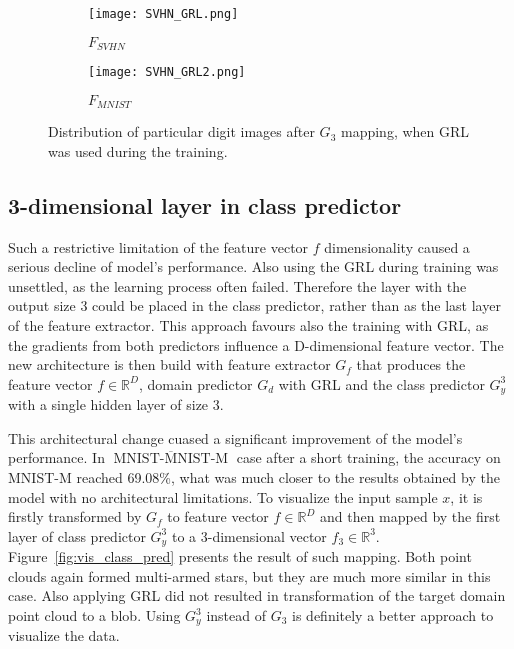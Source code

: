 \documentclass[shortabstract, inz, english]{iithesis}
\DeclareMathOperator{\mnistM}{MNIST-MNIST-M}
\newcommand{\mnist}{$\overline{\mnistM}$ }
\begin{document}
\begin{figure}[htb]%
    \centering
    \begin{subfigure}[b]{0.48\textwidth}
        \texttt{[image: SVHN\_GRL.png]}
        \caption{$F_{SVHN}$}
    \end{subfigure}%
    \begin{subfigure}[b]{0.48\textwidth}
        \texttt{[image: SVHN\_GRL2.png]}
        \caption{$F_{MNIST}$}
    \end{subfigure}%
    \caption{Distribution of particular digit images after $G_{3}$ mapping, when GRL was used during the training.}%
    \label{fig:SVHN_GRL}%
\end{figure}

\subsection{3-dimensional layer in class predictor}
Such a restrictive limitation of the feature vector $f$ dimensionality caused a serious decline of model's performance. Also using the GRL during training was unsettled, as the learning process often failed. Therefore the layer with the output size 3 could be placed in the class predictor, rather than as the last layer of the feature extractor. This approach favours also the training with GRL, as the gradients from both predictors influence a D-dimensional feature vector. The new architecture is then build with feature extractor $G_{f}$ that produces the feature vector $f \in \mathbb{R}^{D}$, domain predictor $G_{d}$ with GRL and the class predictor $G_{y}^{3}$ with a single hidden layer of size 3. 
\par
This architectural change cuased a significant improvement of the model's performance. In \mnist case after a short training, the accuracy on MNIST-M reached 69.08\%, what was much closer to the results obtained by the model with no architectural limitations. To visualize the input sample $x$, it is firstly transformed by $G_{f}$ to feature vector $f \in \mathbb{R}^{D}$ and then mapped by the first layer of class predictor $G_{y}^{3}$ to a 3-dimensional vector $f_{3} \in \mathbb{R}^{3}$. Figure~\ref{fig:vis_class_pred} presents the result of such mapping. Both point clouds again formed multi-armed stars, but they are much more similar in this case. Also applying GRL did not resulted in transformation of the target domain point cloud to a blob. Using $G_{y}^{3}$ instead of $G_{3}$ is definitely a better approach to visualize the data.
\end{document}
